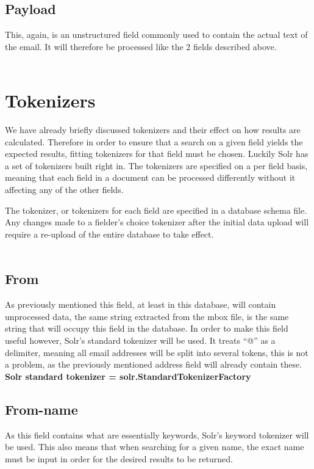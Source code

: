 \documentclass[a4paper,english]{report}
\begin{document}
\subsection{Payload} 
This, again, is an unstructured field commonly used to contain the actual text of the email. It will therefore be processed like the 2 fields described above.\\\\

\section{Tokenizers}

We have already briefly discussed tokenizers and their effect on how results are calculated. Therefore in order to ensure that a search on a given field yields the expected results, fitting tokenizers for that field must be chosen. Luckily Solr has a set of tokenizers built right in. The tokenizers are specified on a per field basis, meaning that each field in a document can be processed differently without it affecting any of the other fields.

The tokenizer, or tokenizers for each field are specified in a database schema file.
Any changes made to a fielder's choice tokenizer after the initial data upload will require a re-upload of the entire database to take effect.\\\\

\noindent
\subsection{From}
As previously mentioned this field, at least in this database, will contain unprocessed data, the same string extracted from the mbox file, is the same string that will occupy this field in the database. In order to make this field useful however, Solr's standard tokenizer will be used. It treats “@” as a delimiter, meaning all email addresses will be split into several tokens, this is not a problem, as the previously mentioned address field will already contain these.\\

\textbf{Solr standard tokenizer = solr.StandardTokenizerFactory}\\

\noindent
\subsection{From-name}
As this field contains what are essentially keywords, Solr's keyword tokenizer will be used.
This also means that when searching for a given name, the exact name must be input in order for the desired results to be returned.
 \\
\end{document}
